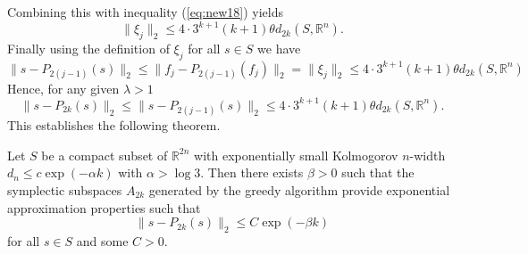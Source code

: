 Combining this with inequality (\ref{eq:new18}) yields
\begin{equation} \label{eq:new20}
	\| \xi_j \|_2 \leq 4\cdot 3^{k+1} (k+1) \theta d_{2k}(S,\mathbb R^n).
\end{equation}
Finally using the definition of $\xi_j$ for all $s\in S$ we have
\begin{equation} \label{eq:new21}
	\| s - P_{2(j-1)}(s) \|_2 \leq \| f_j - P_{2(j-1)}(f_j) \|_2 = \|\xi_j \|_2 \leq 4\cdot 3^{k+1} (k+1) \theta d_{2k}(S,\mathbb R^n)
\end{equation}
Hence, for any given $\lambda > 1$
\begin{equation} \label{eq:new22}
	\| s - P_{2k}(s) \|_2 \leq \| s - P_{2(j-1)}(s) \|_2 \leq 4\cdot 3^{k+1} (k+1) \theta d_{2k}(S,\mathbb R^n).
\end{equation}
This establishes the following theorem.
\begin{theorem}
	Let $S$ be a compact subset of $\mathbb{R}^{2n}$ with exponentially small Kolmogorov $n$-width $d_{n}\leq c\exp(-\alpha k)$ with $\alpha > \log3$. Then there exists $\beta>0$ such that the symplectic subspaces $A_{2k}$ generated by the greedy algorithm provide exponential approximation properties such that
\begin{equation} \label{eq:new23}
	\| s - P_{2k}(s) \|_2 \leq C \exp(-\beta k)
\end{equation}
for all $s\in S$ and some $C>0$.
\end{theorem}

